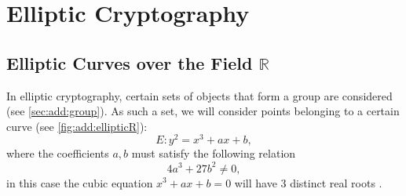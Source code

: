 \section{Elliptic Cryptography}

\subsection{Elliptic Curves over the Field $\mathbb{R}$}



In elliptic cryptography, certain sets of objects that form a group are considered (see \autoref{sec:add:group}). As such a set, we will consider points belonging to a certain curve (see \autoref{fig:add:ellipticR}): 
\[
E: y^2 = x^3 +a x + b,
\]
where the coefficients $a,b$ must satisfy the following relation
\[
4 a^3 + 27 b^2 \ne 0,
\]
in this case the cubic equation $x^3 + a x + b = 0$ will have 3 distinct real roots \cite{Washington:2008:ECN:1388394}. 



